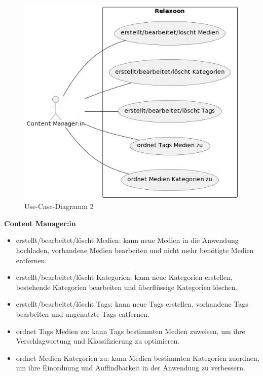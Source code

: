 \begin{figure}[H]
    \centering
    \includegraphics[height=0.84\textwidth]{./pics/ucd2.png}
    \caption{Use-Case-Diagramm 2}
\end{figure}







\newpage

\textbf{Content Manager:in}
\begin{itemize}
    \item erstellt/bearbeitet/löscht Medien: kann neue Medien in die Anwendung hochladen, vorhandene Medien bearbeiten und nicht mehr benötigte Medien entfernen.
    \item erstellt/bearbeitet/löscht Kategorien: kann neue Kategorien erstellen, bestehende Kategorien bearbeiten und überflüssige Kategorien löschen.
    \item erstellt/bearbeitet/löscht Tags: kann neue Tags erstellen, vorhandene Tags bearbeiten und ungenutzte Tags entfernen.
    \item ordnet Tags Medien zu: kann Tags bestimmten Medien zuweisen, um ihre Verschlagwortung und Klassifizierung zu optimieren.
    \item ordnet Medien Kategorien zu: kann Medien bestimmten Kategorien zuordnen, um ihre Einordnung und Auffindbarkeit in der Anwendung zu verbessern.
\end{itemize}
